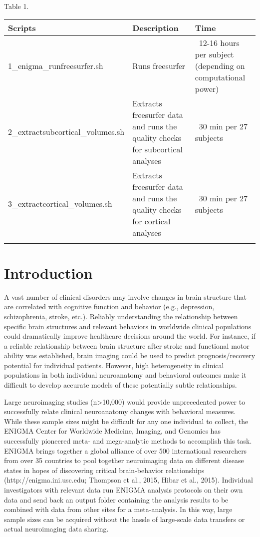 \documentclass[twocolumn]{bmcart}%
\begin{document}
\begin{table*}
{\raggedright{}Table 1.}
  \begin{tabular*}{\textwidth}{p{5cm}p{6cm}p{4cm}}
    Scripts  & Description  &  Time \\
      \hline\noalign{\smallskip}
      1\_enigma\_runfreesurfer.sh     &    Runs freesurfer      &    ~12-16 hours per subject (depending on computational power)    \\
      2\_extractsubcortical\_volumes.sh     &    Extracts freesurfer data and runs the quality checks for subcortical analyses      &    ~30 min per 27 subjects   \\
      3\_extractcortical\_volumes.sh     &    Extracts freesurfer data and runs the quality checks for cortical analyses     &     ~30 min per 27 subjects   \\
      \noalign{\smallskip}\hline
\end{tabular*}
\end{table*}

\section{Introduction}\label{introduction}

A vast number of clinical disorders may involve changes in brain
structure that are correlated with cognitive function and behavior
(e.g., depression, schizophrenia, stroke, etc.). Reliably understanding
the relationship between specific brain structures and relevant
behaviors in worldwide clinical populations could dramatically improve
healthcare decisions around the world. For instance, if a reliable
relationship between brain structure after stroke and functional motor
ability was established, brain imaging could be used to predict
prognosis/recovery potential for individual patients. However, high
heterogeneity in clinical populations in both individual neuroanatomy
and behavioral outcomes make it difficult to develop accurate models of
these potentially subtle relationships.

Large neuroimaging studies (n\textgreater{}10,000) would provide
unprecedented power to successfully relate clinical neuroanatomy changes
with behavioral measures. While these sample sizes might be difficult
for any one individual to collect, the ENIGMA Center for Worldwide
Medicine, Imaging, and Genomics has successfully pioneered meta- and
mega-analytic methods to accomplish this task. ENIGMA brings together a
global alliance of over 500 international researchers from over 35
countries to pool together neuroimaging data on different disease states
in hopes of discovering critical brain-behavior relationships
(http://enigma.ini.usc.edu; Thompson et al., 2015, Hibar et al., 2015). Individual
investigators with relevant data run ENIGMA analysis protocols on their
own data and send back an output folder containing the analysis results
to be combined with data from other sites for a meta-analysis. In this
way, large sample sizes can be acquired without the hassle of
large-scale data transfers or actual neuroimaging data sharing.
\end{document}
